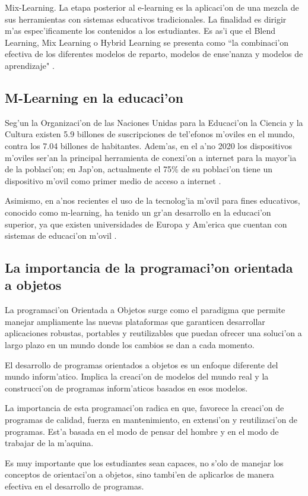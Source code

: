 Mix-Learning. La etapa posterior al e-learning es la aplicaci'on de una mezcla de sus herramientas con sistemas educativos tradicionales. La finalidad es dirigir m'as espec'ificamente los contenidos a los estudiantes. Es as'i que el Blend Learning, Mix Learning o Hybrid Learning se presenta como ``la combinaci'on efectiva de los diferentes modelos de reparto, modelos de ense'nanza y modelos de aprendizaje" \citep{olivares2016tic}.

\subsection{M-Learning en la educaci'on}
Seg'un la Organizaci'on de las Naciones Unidas para la Educaci'on la Ciencia y la Cultura \citep{dykes2012mobile} existen 5.9 billones de suscripciones de tel'efonos m'oviles en el mundo, contra los 7.04 billones de habitantes. Adem'as, en el a'no 2020 los dispositivos m'oviles ser'an la principal herramienta de conexi'on a internet para la mayor'ia de la poblaci'on; en Jap'on, actualmente el 75\% de su poblaci'on tiene un dispositivo m'ovil como primer medio de acceso a internet \citep{camacho2011m}. 

Asimismo, en a'nos recientes el uso de la tecnolog'ia m'ovil para fines educativos, conocido como m-learning, ha tenido un gr'an desarrollo en la educaci'on superior, ya que existen universidades de Europa y Am'erica que cuentan con sistemas de educaci'on m'ovil \citep{traxler2007defining}.

\subsection{La importancia de la programaci'on orientada a objetos}
La programaci'on Orientada a Objetos surge como el paradigma que permite manejar ampliamente las nuevas plataformas que garanticen desarrollar aplicaciones robustas, portables y reutilizables que puedan ofrecer una soluci'on a largo plazo en un mundo donde los cambios se dan a cada momento.

El desarrollo de programas orientados a objetos es un enfoque diferente del mundo inform'atico. Implica la creaci'on de modelos del mundo real y la construcci'on de programas inform'aticos basados en esos modelos.

La importancia de esta programaci'on radica en que, favorece la creaci'on de programas de calidad, fuerza en mantenimiento, en extensi'on y reutilizaci'on de programas. Est'a basada en el modo de pensar del hombre y en el modo de trabajar de la m'aquina.

Es muy importante que los estudiantes sean capaces, no s'olo de manejar los conceptos de orientaci'on a objetos, sino tambi'en de aplicarlos de manera efectiva en el desarrollo de programas.